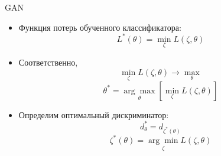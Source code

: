 \documentclass[9pt]{beamer}
\begin{document}
\begin{frame}{GAN}
	\begin{itemize}
		\item Функция потерь обученного классификатора:
		$$ L^*(\theta) = \underset{\zeta}{\min} L(\zeta, \theta) $$
		\item Соответственно,
		$$ \underset{\zeta}{\min} L(\zeta, \theta) \longrightarrow \underset{\theta}{\max} $$
		$$ \theta^* = \underset{\theta}{\arg\max} \left[ \underset{\zeta}{\min} L(\zeta, \theta) \right] $$
		 \item Определим оптимальный дискриминатор:
		 $$ d^*_{\theta} = d_{\zeta^*(\theta)} $$
		 $$ \zeta^*(\theta) =  \underset{\zeta}{\arg\min} L(\zeta, \theta)$$
	\end{itemize}
\end{frame}
\end{document}
